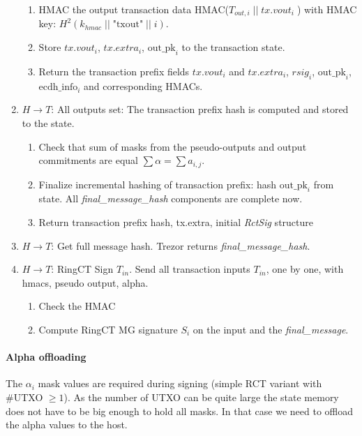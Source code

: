 \documentclass[]{article}
\begin{document}
\begin{enumerate}
\begin{enumerate}
        \item HMAC the output transaction data HMAC($T_{out,i} \; || \; tx.vout_i \; $) with HMAC key: $H^2(k_{hmac} \; || \; \text{"txout"} \; || \; i)$.
                
        \item Store $tx.vout_i$, $tx.extra_i$, $\text{out\_pk}_i$ to the transaction state.
        
		\item Return the transaction prefix fields $tx.vout_i$ and $tx.extra_i$, $rsig_i$, $\text{out\_pk}_i$, $\text{ecdh\_info}_i$ and corresponding HMACs.
		
	\end{enumerate}
	  
	\item $H \rightarrow T$: All outputs set: The transaction prefix hash is computed and stored to the state. 
	
	\begin{enumerate}
		\item Check that sum of masks from the pseudo-outputs and output commitments are equal $\sum \alpha = \sum a_{i,j}$.
		
		\item Finalize incremental hashing of transaction prefix: hash $\text{out\_pk}_i$ from state. All \emph{final\_message\_hash} components are complete now. 
		
		\item Return transaction prefix hash, tx.extra, initial \emph{RctSig} structure
	\end{enumerate} 

	\item $H \rightarrow T$: Get full message hash. Trezor returns \emph{final\_message\_hash}.
	
	\item $H \rightarrow T$: RingCT Sign $T_{in}$. Send all transaction inputs $T_{in}$, one by one, with hmacs, pseudo output, alpha.
	\begin{enumerate}
		\item Check the HMAC
		
		\item Compute RingCT MG signature $S_i$ on the input and the \emph{final\_message}.
		
	\end{enumerate} 
	
\end{enumerate}

\paragraph{Alpha offloading}
The $\alpha_i$ mask values are required during signing (simple RCT variant with \#UTXO $\ge 1$). As the number of UTXO can be quite large the state memory does not have to be big enough to hold all masks. In that case we need to offload the alpha values to the host. 
\end{document}
